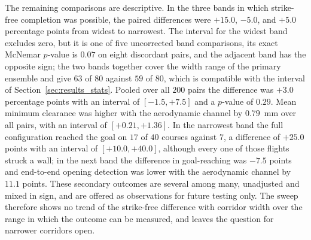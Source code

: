 \documentclass[final,5p,times]{elsarticle}
\begin{document}
The remaining comparisons are descriptive. In the three bands in which strike-free completion was possible, the paired differences were $+15.0$, $-5.0$, and $+5.0$ percentage points from widest to narrowest. The interval for the widest band excludes zero, but it is one of five uncorrected band comparisons, its exact McNemar $p$-value is $0.07$ on eight discordant pairs, and the adjacent band has the opposite sign; the two bands together cover the width range of the primary ensemble and give $63$ of $80$ against $59$ of $80$, which is compatible with the interval of Section~\ref{sec:results_stats}. Pooled over all $200$ pairs the difference was $+3.0$ percentage points with an interval of $[-1.5, +7.5]$ and a $p$-value of $0.29$. Mean minimum clearance was higher with the aerodynamic channel by $0.79$~mm over all pairs, with an interval of $[+0.21, +1.36]$. In the narrowest band the full configuration reached the goal on $17$ of $40$ courses against $7$, a difference of $+25.0$ points with an interval of $[+10.0, +40.0]$, although every one of those flights struck a wall; in the next band the difference in goal-reaching was $-7.5$ points and end-to-end opening detection was lower with the aerodynamic channel by $11.1$ points. These secondary outcomes are several among many, unadjusted and mixed in sign, and are offered as observations for future testing only. The sweep therefore shows no trend of the strike-free difference with corridor width over the range in which the outcome can be measured, and leaves the question for narrower corridors open.
\end{document}
